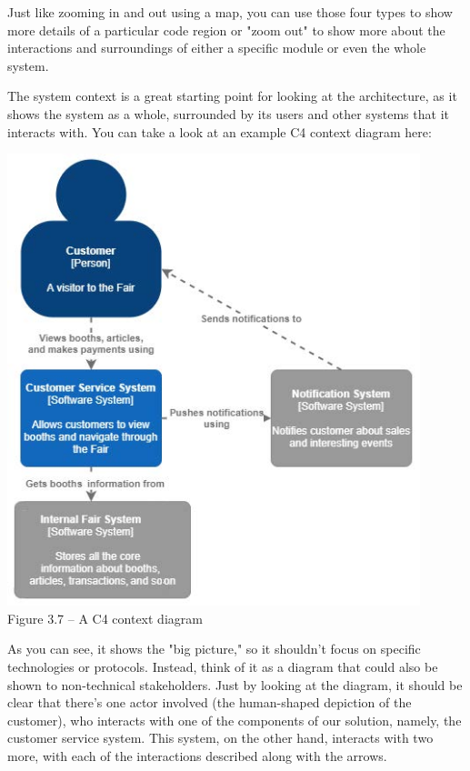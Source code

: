 Just like zooming in and out using a map, you can use those four types to show more details of a particular code region or "zoom out" to show more about the interactions and surroundings of either a specific module or even the whole system.

The system context is a great starting point for looking at the architecture, as it shows the system as a whole, surrounded by its users and other systems that it interacts with. You can take a look at an example C4 context diagram here:

\begin{center}
\includegraphics[width=0.9\textwidth]{content/1/chapter3/images/7.jpg}\\
Figure 3.7 – A C4 context diagram
\end{center}

As you can see, it shows the "big picture," so it shouldn't focus on specific technologies or protocols. Instead, think of it as a diagram that could also be shown to non-technical stakeholders. Just by looking at the diagram, it should be clear that there's one actor involved (the human-shaped depiction of the customer), who interacts with one of the components of our solution, namely, the customer service system. This system, on the other hand, interacts with two more, with each of the interactions described along with the arrows.


